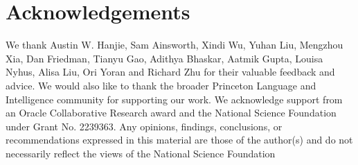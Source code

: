 \section*{Acknowledgements}
We thank Austin W. Hanjie, Sam Ainsworth, Xindi Wu, Yuhan Liu, Mengzhou Xia, Dan Friedman, Tianyu Gao, Adithya Bhaskar, Aatmik Gupta, Louisa Nyhus, Alisa Liu, Ori Yoran and Richard Zhu for their valuable feedback and advice.
We would also like to thank the broader Princeton Language and Intelligence community for supporting our work.
We acknowledge support from an Oracle Collaborative Research award and the National Science Foundation under Grant No. 2239363.
Any opinions, findings, conclusions, or recommendations expressed in this material are those of the author(s) and do not necessarily reflect the views of the National Science Foundation